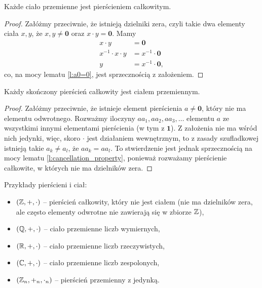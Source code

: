 \begin{theorem}
    Każde ciało przemienne jest pierścieniem całkowitym.
\end{theorem}
\begin{proof}
    Załóżmy przeciwnie, że istnieją dzielniki zera, czyli takie dwa elementy ciała $x, y$, że $x, y \neq \mathbf{0}$ oraz $x \cdot y = \mathbf{0}$. Mamy
    \begin{align*}
        x \cdot y &= \mathbf{0} \\
        x^{-1} \cdot x \cdot y &= x^{-1} \cdot \mathbf{0} \\
        y &= x^{-1} \cdot \mathbf{0},
    \end{align*}
    co, na mocy lematu \ref{l:a0=0}, jest sprzecznością z założeniem.
\end{proof}

\begin{theorem}
    Każdy skończony pierścień całkowity jest ciałem przemiennym.
\end{theorem}
\begin{proof}
    Załóżmy przeciwnie, że istnieje element pierścienia $a \neq \mathbf{0}$, który nie ma elementu odwrotnego. Rozważmy iloczyny $aa_1, aa_2, aa_3, \ldots$ elementu $a$ ze wszystkimi innymi elementami pierścienia (w tym z $\mathbf{1}$). Z założenia nie ma wśród nich jedynki, więc, skoro $\cdot$ jest działaniem wewnętrznym, to z zasady szufladkowej istnieją takie $a_k \neq a_l$, że $aa_k = aa_l$. To stwierdzenie jest jednak sprzecznością na mocy lematu \ref{l:cancellation_property}, ponieważ rozważamy pierścienie całkowite, w których nie ma dzielników zera.
\end{proof}

\begin{example}
    Przykłady pierścieni i ciał:
    \begin{itemize}
        \item $(\mathbb Z, +, \cdot)$ -- pierścień całkowity, który nie jest ciałem (nie ma dzielników zera, ale często elementy odwrotne nie zawierają się w zbiorze $\mathbb Z$),
        \item $(\mathbb Q, +, \cdot)$ -- ciało przemienne liczb wymiernych,
        \item $(\mathbb R, +, \cdot)$ -- ciało przemienne liczb rzeczywistych,
        \item $(\mathbb C, +, \cdot)$ -- ciało przemienne liczb zespolonych,
        \item $(\mathbb Z_n, +_n, \cdot_n)$ -- pierścień przemienny z jedynką.
    \end{itemize}
\end{example}

